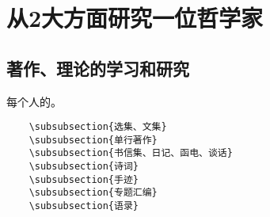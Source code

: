 \documentclass[UTF8]{../RepresentationUniverse}
\begin{document}
\section{从2大方面研究一位哲学家}

\subsection{著作、理论的学习和研究}
每个人的。

\begin{lstlisting}
    \subsubsection{选集、文集}
    \subsubsection{单行著作}
    \subsubsection{书信集、日记、函电、谈话}
    \subsubsection{诗词}
    \subsubsection{手迹}
    \subsubsection{专题汇编}
    \subsubsection{语录}
\end{lstlisting}


    
\end{document}
